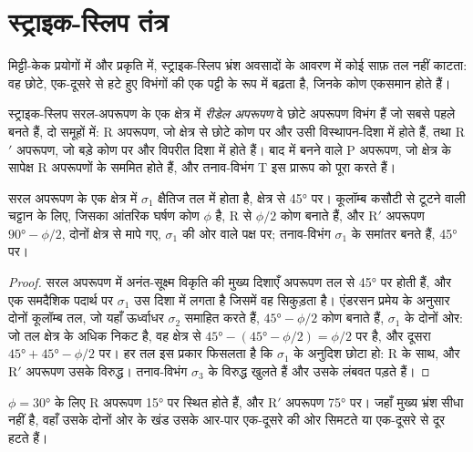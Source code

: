 \section{स्ट्राइक-स्लिप तंत्र}\label{sec:b3:extension-strike-slip:strike-slip}

मिट्टी-केक प्रयोगों में और प्रकृति में, स्ट्राइक-स्लिप भ्रंश अवसादों के आवरण में
कोई साफ़ तल नहीं काटता: वह छोटे, एक-दूसरे से हटे हुए विभंगों की एक पट्टी के रूप में बढ़ता है,
जिनके कोण एकसमान होते हैं।

\begin{definition}[रीडेल अपरूपण]\label{def:b3:extension-strike-slip:riedel}
स्ट्राइक-स्लिप सरल-अपरूपण के एक क्षेत्र में \emph{रीडेल अपरूपण} वे
छोटे अपरूपण विभंग हैं जो सबसे पहले बनते हैं, दो समूहों में: R
अपरूपण, जो क्षेत्र से छोटे कोण पर और उसी विस्थापन-दिशा में होते हैं, तथा R$'$
अपरूपण, जो बड़े कोण पर और विपरीत दिशा में होते हैं। बाद में बनने वाले P अपरूपण, जो क्षेत्र के सापेक्ष R अपरूपणों के सममित होते हैं,
और तनाव-विभंग T इस प्रारूप को पूरा करते हैं।
\end{definition}

\begin{proposition}[रीडेल कोण]\label{prop:b3:extension-strike-slip:riedel}
सरल अपरूपण के एक क्षेत्र में $\sigma_1$ क्षैतिज तल में होता है,
क्षेत्र से \ang{45} पर। कूलॉम्ब कसौटी से टूटने वाली चट्टान के लिए, जिसका आंतरिक घर्षण कोण $\phi$ है,
R  से $\phi/2$ कोण बनाते हैं, और
R$'$ अपरूपण $\ang{90} - \phi/2$, दोनों क्षेत्र से मापे गए, $\sigma_1$ की ओर वाले पक्ष पर;
तनाव-विभंग $\sigma_1$ के समांतर बनते हैं,
\ang{45} पर।
\end{proposition}

\begin{proof}
सरल अपरूपण में अनंत-सूक्ष्म विकृति की मुख्य दिशाएँ अपरूपण तल से
\ang{45} पर होती हैं, और एक समदैशिक पदार्थ पर $\sigma_1$ उस दिशा में लगता है जिसमें वह सिकुड़ता है।
एंडरसन प्रमेय के अनुसार दोनों कूलॉम्ब तल, जो यहाँ ऊर्ध्वाधर $\sigma_2$ समाहित करते हैं,
$\ang{45} - \phi/2$ कोण बनाते हैं, $\sigma_1$ के दोनों ओर: जो तल क्षेत्र के अधिक निकट है,
वह क्षेत्र से $\ang{45} -
(\ang{45} - \phi/2) = \phi/2$ पर है, और दूसरा $\ang{45} + \ang{45} -
\phi/2$ पर। हर तल इस प्रकार फिसलता है कि $\sigma_1$ के अनुदिश छोटा हो: R  के साथ,
और R$'$ अपरूपण उसके विरुद्ध। तनाव-विभंग $\sigma_3$ के विरुद्ध खुलते हैं और
उसके लंबवत पड़ते हैं।
\end{proof}

$\phi = \ang{30}$ के लिए R अपरूपण \ang{15} पर स्थित होते हैं, और R$'$ अपरूपण
\ang{75} पर। जहाँ मुख्य भ्रंश सीधा नहीं है, वहाँ उसके दोनों ओर के खंड
उसके आर-पार एक-दूसरे की ओर सिमटते या एक-दूसरे से दूर हटते हैं।


